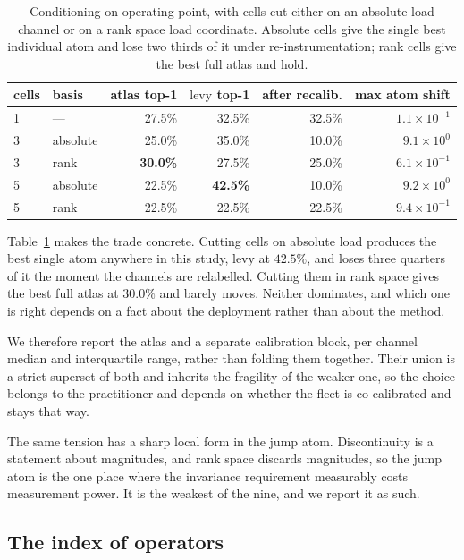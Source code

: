 \documentclass[11pt]{article}
\begin{document}
\begin{table}[t]
\centering
\begin{tabular}{llrrrr}
\toprule
cells & basis & atlas top-1 & $\mathrm{levy}$ top-1 & after recalib. &
max atom shift \\
\midrule
1 & ---      & 27.5\% & 32.5\% & 32.5\% & $1.1\times10^{-1}$ \\
3 & absolute & 25.0\% & 35.0\% & 10.0\% & $9.1\times10^{0}$ \\
3 & rank     & \textbf{30.0\%} & 27.5\% & 25.0\% & $6.1\times10^{-1}$ \\
5 & absolute & 22.5\% & \textbf{42.5\%} & 10.0\% & $9.2\times10^{0}$ \\
5 & rank     & 22.5\% & 22.5\% & 22.5\% & $9.4\times10^{-1}$ \\
\bottomrule
\end{tabular}
\caption{Conditioning on operating point, with cells cut either on an absolute
load channel or on a rank space load coordinate. Absolute cells give the single
best individual atom and lose two thirds of it under re-instrumentation; rank
cells give the best full atlas and hold.}
\label{tab:cells}
\end{table}

Table~\ref{tab:cells} makes the trade concrete. Cutting cells on absolute load
produces the best single atom anywhere in this study, $\mathrm{levy}$ at
$42.5\%$, and loses three quarters of it the moment the channels are relabelled.
Cutting them in rank space gives the best full atlas at $30.0\%$ and barely
moves. Neither dominates, and which one is right depends on a fact about the
deployment rather than about the method.

We therefore report the atlas and a separate calibration block, per channel
median and interquartile range, rather than folding them together. Their union
is a strict superset of both and inherits the fragility of the weaker one, so
the choice belongs to the practitioner and depends on whether the fleet is
co-calibrated and stays that way.

The same tension has a sharp local form in the jump atom. Discontinuity is a
statement about magnitudes, and rank space discards magnitudes, so the jump
atom is the one place where the invariance requirement measurably costs
measurement power. It is the weakest of the nine, and we report it as such.

\subsection{The index of operators}
\end{document}
